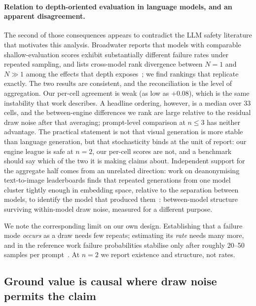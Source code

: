 \documentclass[11pt]{article}
\begin{document}
\paragraph{Relation to depth-oriented evaluation in language models, and an
apparent disagreement.} The second of those consequences appears to
contradict the LLM safety literature that motivates this analysis. Broadwater
reports that models with comparable shallow-evaluation scores exhibit
substantially different failure rates under repeated sampling, and lists
cross-model rank divergence between $N=1$ and $N \gg 1$ among the effects
that depth
exposes~\cite{broadwater2026apst,broadwater2026reliability};
we find rankings that replicate exactly. The two results are consistent, and
the reconciliation is the level of aggregation. Our per-cell agreement is
weak (as low as $+0.08$), which is the same instability that work
describes. A headline ordering, however, is a median over 33 cells, and the
between-engine differences we rank are large relative to the residual draw
noise after that averaging; prompt-level comparison at $n \leq 3$ has neither
advantage. The practical statement is not that visual generation is more
stable than language generation, but that stochasticity binds at the unit of
report: our engine league is safe at $n=2$, our per-cell scores are not, and a
benchmark should say which of the two it is making claims about. Independent
support for the aggregate half comes from an unrelated direction: work on
deanonymising text-to-image leaderboards finds that repeated generations from
one model cluster tightly enough in embedding space, relative to the
separation between models, to identify the model that produced
them~\cite{naseh2026identifying}: between-model structure surviving
within-model draw noise, measured for a different purpose.

We note the corresponding limit on our own design. Establishing that a
failure mode \emph{occurs} as a draw needs few repeats; estimating its
\emph{rate} needs many more, and in the reference work failure probabilities
stabilise only after roughly 20--50 samples per
prompt~\cite{broadwater2026reliability}. At $n=2$ we report
existence and structure, not rates.

\subsection{Ground value is causal where draw noise permits the claim}
\label{sec:ground}
\end{document}
